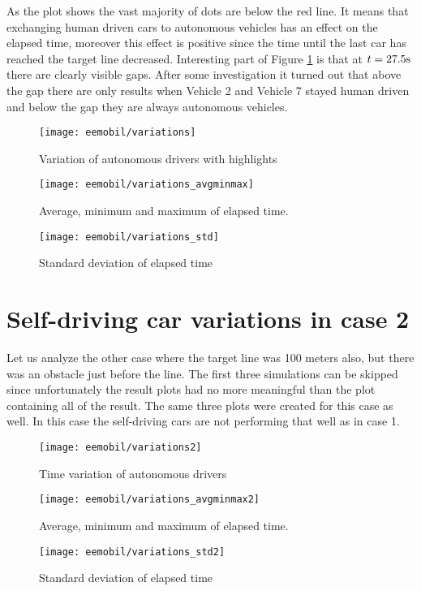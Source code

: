 		As the plot shows the vast majority of dots are below the red line. It means that exchanging human driven cars to autonomous vehicles has an effect on the elapsed time, moreover this effect is positive since the time until the last car has reached the target line decreased. Interesting part of Figure \ref{fig:self_variations} is that at $t=27.5\rm s$ there are clearly visible gaps. After some investigation it turned out that above the gap there are only results when Vehicle 2 and Vehicle 7 stayed human driven and below the gap they are always autonomous vehicles.
		\begin{figure}
			\centering
			\texttt{[image: eemobil/variations]}
			\caption{Variation of autonomous drivers with highlights}
			\label{fig:self_variations}
		\end{figure}
		\begin{figure}
			\centering
			\texttt{[image: eemobil/variations\_avgminmax]}
			\caption{Average, minimum and maximum of elapsed time.}
			\label{fig:self_variations_avgminmax}
		\end{figure}
		
		\begin{figure}
			\centering
			\texttt{[image: eemobil/variations\_std]}
			\caption{Standard deviation of elapsed time}
			\label{fig:self_variations_std}
		\end{figure}
	\section{Self-driving car variations in case 2}
		Let us analyze the other case where the target line was 100 meters also, but there was an obstacle just before the line. The first three simulations can be skipped since unfortunately the result plots had no more meaningful than the plot containing all of the result. The same three plots were created for this case as well. In this case the self-driving cars are not performing that well as in case 1.
		\begin{figure}
			\centering
			\texttt{[image: eemobil/variations2]}
			\caption{Time variation of autonomous drivers}
			\label{fig:self_variations2}
		\end{figure}
		\begin{figure}
			\centering
			\texttt{[image: eemobil/variations\_avgminmax2]}
			\caption{Average, minimum and maximum of elapsed time.}
			\label{fig:self_variations_avgminmax2}
		\end{figure}
		\begin{figure}
			\centering
			\texttt{[image: eemobil/variations\_std2]}
			\caption{Standard deviation of elapsed time}
			\label{fig:self_variations_std2}
		\end{figure}
